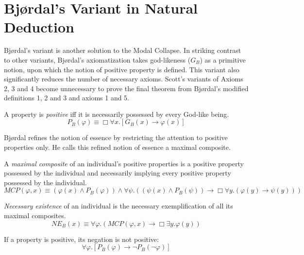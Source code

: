 \documentclass[smallextended]{svjour3}
\newcommand{\imp}{\rightarrow}
\newcommand{\all}{\forall}
\newcommand{\ex}{\exists}
\newcommand{\nec}{\Box} %
\begin{document}
\section{Bj{\o}rdal's Variant in Natural Deduction}
\label{sec:bjordal}


\setcounter{lemma}{0}
\setcounter{theorem}{0}
\setcounter{corollary}{0}


Bj{\o}rdal's variant \citep{bjordal,fuhrmann} is another solution to the Modal Collapse. In striking contrast to other variants, Bj\o rdal's axiomatization takes god-likeness ($G_B$) as a primitive notion, upon which the notion of positive property is defined. This variant also significantly reduces the number of necessary axioms. Scott's variants of Axioms 2, 3 and 4 become unnecessary to prove the final theorem from Bj{\o}rdal's modified definitions 1, 2 and 3 and axioms 1 and 5.


\setcounter{definition}{0}
\begin{definition}[Changed]
\label{B:D1}
A property is \emph{positive} iff it is necessarily possessed by every God-like being.
$$
P_B(\varphi) \equiv \nec \all x. [G_B(x) \imp \varphi(x)]
$$
\end{definition}

Bj{\o}rdal refines the notion of essence by restricting the attention to positive properties only. He calls this refined notion of essence a maximal composite.

\newcommand{\MCP}{\mathit{MCP}}

\begin{definition}[Changed]
\label{B:D2}
A \emph{maximal composite} of an individual's positive properties is a positive property possessed by the individual and necessarily implying every positive property possessed by the individual.
$$\MCP(\varphi, x) \equiv (\varphi(x) \wedge P_B (\varphi)) \wedge \all\psi.((\psi(x) \wedge P_B (\psi)) \imp \nec\all y.(\varphi(y) \imp \psi(y)))
$$
\end{definition}

\begin{definition}[Changed]
\label{B:D3}
\emph{Necessary existence} of an individual is the necessary exemplification of all its maximal composites.
$$
NE_B (x) \equiv \all\varphi. (\MCP(\varphi, x) \imp \nec \ex y.\varphi(y))
$$
\end{definition}

\setcounter{axiom}{0}
\begin{axiom}[Changed]
\label{A:A1'} If a property is positive, its negation is not positive: 
$$
\all \varphi. [P_B (\varphi) \imp \neg P_B (\neg\varphi)]
$$
\end{axiom}
\end{document}
